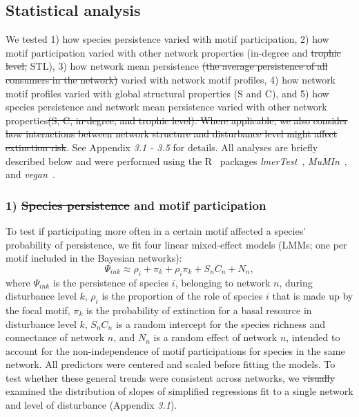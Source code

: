\documentclass[12pt]{article}
\providecommand{\DIFadd}[1]{{\protect\color{blue}\uwave{#1}}} %
\providecommand{\DIFdel}[1]{{\protect\color{red}\sout{#1}}}                      %
\providecommand{\DIFaddbegin}{} %
\providecommand{\DIFaddend}{} %
\providecommand{\DIFdelbegin}{} %
\providecommand{\DIFdelend}{} %
\newcommand{\DIFscaledelfig}{0.5}
\newlength{\DIFdelgraphicswidth} %
\newlength{\DIFdelgraphicsheight} %
\newcommand{\DIFaddincludegraphics}[2][]{{\color{blue}\fbox{\DIFOincludegraphics[#1]{#2}}}} %
\newcommand{\DIFdelincludegraphics}[2][]{%
\sbox{\DIFdelgraphicsbox}{\DIFOincludegraphics[#1]{#2}}%
\settoboxwidth{\DIFdelgraphicswidth}{\DIFdelgraphicsbox} %
\settoboxtotalheight{\DIFdelgraphicsheight}{\DIFdelgraphicsbox} %
\scalebox{\DIFscaledelfig}{%
\parbox[b]{\DIFdelgraphicswidth}{\usebox{\DIFdelgraphicsbox}\\[-\baselineskip] \rule{\DIFdelgraphicswidth}{0em}}\llap{\resizebox{\DIFdelgraphicswidth}{\DIFdelgraphicsheight}{%
\setlength{\unitlength}{\DIFdelgraphicswidth}%
\begin{picture}(1,1)%
\thicklines\linethickness{2pt} %
{\color[rgb]{1,0,0}\put(0,0){\framebox(1,1){}}}%
{\color[rgb]{1,0,0}\put(0,0){\line( 1,1){1}}}%
{\color[rgb]{1,0,0}\put(0,1){\line(1,-1){1}}}%
\end{picture}%
}\hspace*{3pt}}} %
} %
\DeclareRobustCommand{\DIFaddbegin}{\DIFOaddbegin \let\includegraphics\DIFaddincludegraphics} %
\DeclareRobustCommand{\DIFaddend}{\DIFOaddend \let\includegraphics\DIFOincludegraphics} %
\DeclareRobustCommand{\DIFdelbegin}{\DIFOdelbegin \let\includegraphics\DIFdelincludegraphics} %
\DeclareRobustCommand{\DIFdelend}{\DIFOaddend \let\includegraphics\DIFOincludegraphics} %
\begin{document}
\begin{spacing}{2.0}
	\subsection*{Statistical analysis} 

	We tested 1) how species persistence varied with motif participation, 2) how motif participation varied with other network properties (in-degree and \DIFdelbegin \DIFdel{trophic level, }\DIFdelend STL), 3) how network mean persistence \DIFdelbegin \DIFdel{(the average persistence of all consumers in the network) }\DIFdelend varied with network motif profiles, 4) how network motif profiles varied with global structural properties (S and C), and 5) how species persistence and network mean persistence varied with other network properties\DIFdelbegin \DIFdel{(S, C, in-degree, and trophic level).
        Where applicable, we also consider how interactions between network structure and disturbance level might affect extinction risk}\DIFdelend .
	See Appendix \emph{3.1 - 3.5} for details. 
	All analyses are briefly described below and were performed using the R~\citep{R} packages \emph{lmerTest}~\citep{lmerTest}, \emph{MuMIn}~\citep{MuMIn}, and \emph{vegan}~\citep{vegan}.

    
    \subsubsection*{1) \DIFdelbegin \DIFdel{Species persistence }\DIFdelend \DIFaddbegin \DIFadd{Persistence }\DIFaddend and motif participation}

        To test if participating more often in a certain motif affected a species' probability of persistence, we fit four linear mixed-effect models (LMMs; one per motif included in the Bayesian networks):
            \begin{equation}
                \Psi_{ink} \approx \rho_{i} + \pi_{k} + \rho_{i}\pi_{k} +
                S_{n}C_{n} + N_n,
                \label{propreq}
            \end{equation}
        \noindent where $\Psi_{ink}$ is the persistence of species $i$, belonging to network $n$, during disturbance level $k$, $\rho_{i}$ is the proportion of the role of species $i$ that is made up by the focal motif, $\pi_k$ is the probability of extinction for a basal resource in disturbance level $k$,  $S_{n}C_{n}$ is a random intercept for the species richness and connectance of network $n$, and $N_n$ is a random effect of network $n$, intended to account for the non-independence of motif participations for species in the same network.
        All predictors were centered and scaled before fitting the models.         
        To test whether these general trends were consistent across networks, we \DIFdelbegin \DIFdel{visually }\DIFdelend examined the distribution of slopes of simplified regressions fit to a single network and level of disturbance (Appendix \emph{3.1}).


\end{spacing}
\end{document}
